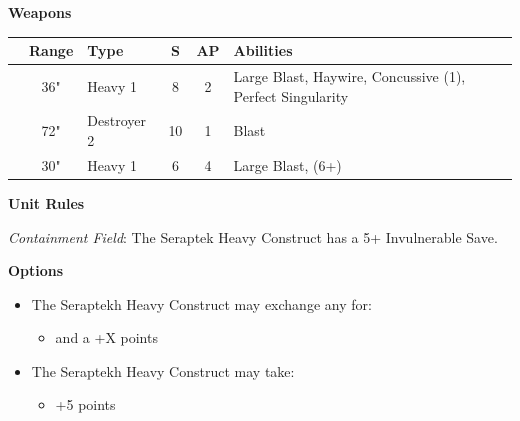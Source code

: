 \begin{minipage}[t]{0.72\textwidth}
	\vspace*{2em}
	\textbf{Weapons}
	
	\begin{tabular}{L{90 pt} c C{40pt} *{2}{c} >{\raggedright\arraybackslash}p{130pt}}
		& Range & Type & S & AP & Abilities \\
		\hline
		 & 36" & Heavy 1 & 8 & 2 & Large Blast, Haywire, Concussive (1), Perfect Singularity  \\
		 & 72" & Destroyer 2 & 10 & 1 & Blast \\
		 & 30" & Heavy 1 & 6 & 4 & Large Blast,  (6+) \\
	\end{tabular}
	
	\vspace*{2em}
	\textbf{Unit Rules}
	
	\textit{Containment Field}: The Seraptek Heavy Construct has a 5+ Invulnerable Save. 
	
	\vspace*{2em}
	\textbf{Options}
	\begin{itemize}
		\item The Seraptekh Heavy Construct may exchange any  for:
		\begin{itemize}
			\item {} and a  \dotfill +X points
		\end{itemize}
		\item The Seraptekh Heavy Construct may take:
		\begin{itemize}
			\item {} \dotfill +5 points
		\end{itemize} 
	\end{itemize}
\end{minipage}



\newpage
